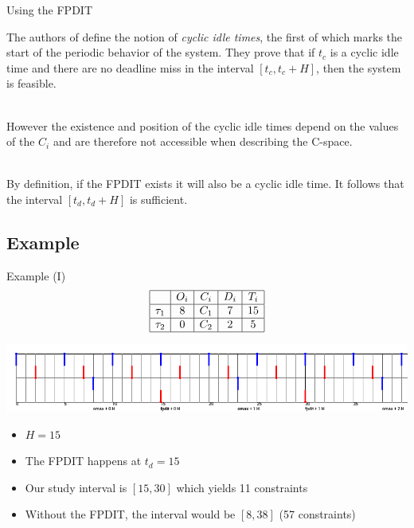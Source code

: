 \documentclass{beamer}
\begin{document}
    \begin{frame}{Using the FPDIT}

        The authors of \cite{choquet2004minimal} define the notion of \emph{cyclic idle times}, the first of which marks the start of the periodic behavior of the system. They prove that if $t_c$ is a cyclic idle time and there are no deadline miss in the interval $[t_c, t_c + H]$, then the system is feasible.

        ~\\

        However the existence and position of the cyclic idle times depend on the values of the $C_i$ and are therefore not accessible when describing the C-space.

        ~\\

        By definition, if the FPDIT exists it will also be a cyclic idle time. It follows that the interval $[t_d, t_d + H]$ is sufficient.

    \end{frame}

    \subsection{Example}

    \begin{frame}{Example (I)}
        \[
        \begin{array}{|r|c|c|c|c|}
         \hline
          & O_i & C_i & D_i & T_i \\
         \hline
         \tau_1 & 8 & C_1 & 7 & 15\\
         \hline
         \tau_2 & 0 & C_2 & 2 & 5\\
         \hline
        \end{array}
        \]

        \includegraphics[width=\textwidth]{figs/CspaceExampleArrDead.png}

        \begin{itemize}
            \item $H = 15$
            \item The FPDIT happens at $t_d = 15$
            \item Our study interval is $[15, 30]$ which yields 11 constraints
            \item Without the FPDIT, the interval would be $[8, 38]$ (57 constraints)
        \end{itemize}
    \end{frame}
\end{document}
